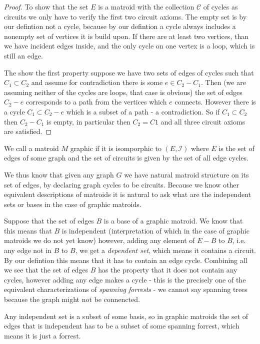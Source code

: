 \begin{proof}
To show that the set $E$ is a matroid with the collection $\mathcal{C}$ of cycles as circuits we only have to verify the first two circuit axioms. The empty set is by our defintion not a cycle, because by our defintion a cycle always includes a nonempty set of vertices it is build upon. If there are at least two vertices, than we have incident edges inside, and the only cycle on one vertex is a loop, which is still an edge.

The show the first property suppose we have two sets of edges of cycles such that $C_1 \subset C_2$ and assume for contradiction there is some $e \in C_2 - C_1$. Then (we are assuming neither of the cycles are loops, that case is obvious) the set of edges $C_2 - e$ corresponds to a path from the vertices which $e$ connects. However there is a cycle $C_1 \subset C_2 -e$ which is a subset of a path - a contradiction. So if $C_1 \subset C_2$ then $C_2 - C_1$ is empty, in particular then $C_2 = C1$ and all three circuit axioms are satisfied.



\end{proof}

\begin{defn}
    We call a matroid $M$ graphic if it is isomporphic to $(E, \mathcal{I})$ where $E$ is the set of edges of some graph and the set of circuits is given by the set of all edge cycles.
\end{defn}

We thus know that given any graph $G$ we have natural matroid structure on its set of edges, by declaring graph cycles to be circuits. Because we know other equivalent descriptions of matroids it is natural to ask what are the independent sets or bases in the case of graphic matroids. 

Suppose that the set of edges $B$ is a base of a graphic matroid. We know that this means that $B$ is independent (interpretation of which in the case of graphic matroids we do not yet know) however, adding any element of $E-B$ to $B$, i.e. any edge not in $B$ to $B$, we get a \textit{dependent set}, which means it contains a circuit. By our defintion this means that it has to contain an edge cycle. Combining all we see that the set of edges $B$ has the property that it does not contain any cycles, however adding any edge makes a cycle - this is the precisely one of the equivalent characterizations of \textit{spanning forrests} - we cannot say spanning trees because the graph might not be connencted. 

Any independent set is a subset of some basis, so in graphic matroids the set of edges that is independent has to be a subset of some spanning forrest, which means it is just a forrest.

